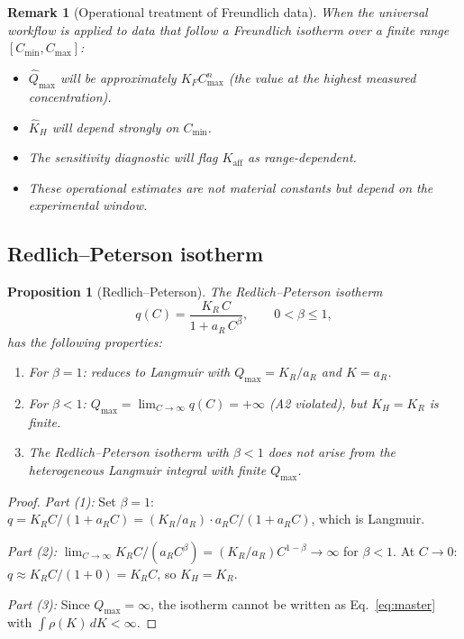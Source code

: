 \documentclass[12pt]{article}
\newtheorem{proposition}{Proposition}
\newtheorem{remark}{Remark}
\begin{document}
\begin{remark}[Operational treatment of Freundlich data]
When the universal workflow is applied to data that follow a
Freundlich isotherm over a finite range $[C_{\min},C_{\max}]$:
\begin{itemize}[nosep]
  \item $\widehat{Q}_{\max}$ will be approximately $K_F C_{\max}^n$
        (the value at the highest measured concentration).
  \item $\widehat{K}_H$ will depend strongly on $C_{\min}$.
  \item The sensitivity diagnostic will flag
        $K_{\mathrm{aff}}$ as range-dependent.
  \item These operational estimates are \emph{not} material constants
        but depend on the experimental window.
\end{itemize}
\end{remark}

\subsection{Redlich--Peterson isotherm}

\begin{proposition}[Redlich--Peterson]
\label{prop:rp}
The Redlich--Peterson isotherm~\cite{Redlich1959}
\begin{equation}
  q(C) = \frac{K_R\,C}{1+a_R\,C^{\beta}},
  \qquad 0<\beta\le 1,
  \label{eq:rp}
\end{equation}
has the following properties:
\begin{enumerate}[nosep]
  \item For $\beta=1$: reduces to Langmuir with
        $Q_{\max}=K_R/a_R$ and $K=a_R$.
  \item For $\beta<1$:
        $Q_{\max}=\lim_{C\to\infty}q(C)=+\infty$ (A2 violated),
        but $K_H=K_R$ is finite.
  \item The Redlich--Peterson isotherm with $\beta<1$ does not arise
        from the heterogeneous Langmuir integral with finite
        $Q_{\max}$.
\end{enumerate}
\end{proposition}

\begin{proof}
\textit{Part (1):} Set $\beta=1$:
$q=K_R C/(1+a_R C)=(K_R/a_R)\cdot a_R C/(1+a_R C)$, which is
Langmuir.

\textit{Part (2):}
$\lim_{C\to\infty}K_R C/(a_R C^\beta)
=(K_R/a_R)C^{1-\beta}\to\infty$ for $\beta<1$.
At $C\to 0$: $q\approx K_R C/(1+0)=K_R C$, so $K_H=K_R$.

\textit{Part (3):}
Since $Q_{\max}=\infty$, the isotherm cannot be written as
Eq.~\eqref{eq:master} with $\int\rho(K)\,dK<\infty$.
\end{proof}
\end{document}
